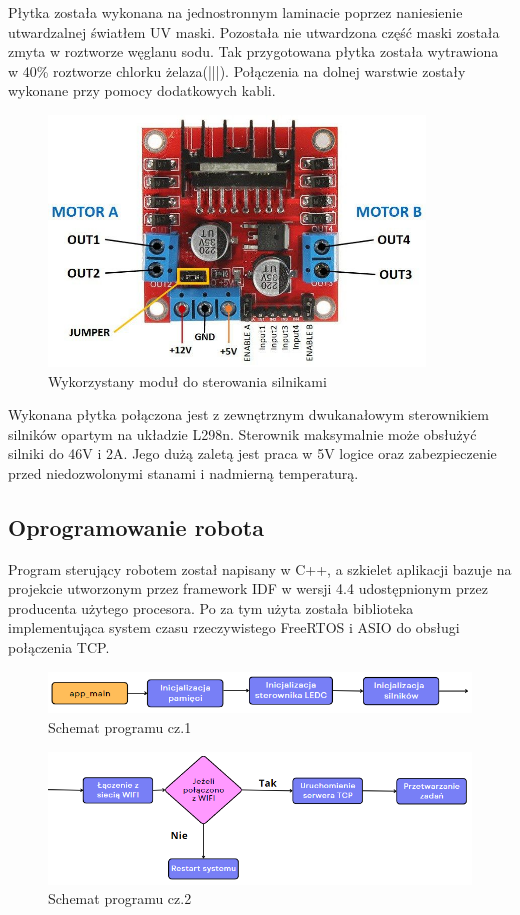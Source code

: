 Płytka została wykonana na jednostronnym laminacie poprzez naniesienie utwardzalnej światłem UV maski. Pozostała nie utwardzona część maski 
została zmyta w roztworze węglanu sodu. Tak przygotowana płytka została wytrawiona w 40\% roztworze chlorku żelaza(|||). 
Połączenia na dolnej warstwie zostały wykonane przy pomocy dodatkowych kabli. 

\begin{figure}[H]
	\centering
	\includegraphics[width=10cm]{pages/robot/zdjecia/l298n_modul.jpg}
	\caption{Wykorzystany moduł do sterowania silnikami}
	\label{Fig:modulL298}
\end{figure}

Wykonana płytka połączona jest z zewnętrznym dwukanałowym sterownikiem silników opartym na układzie L298n. 
Sterownik maksymalnie może obsłużyć silniki do 46V i 2A. Jego dużą zaletą jest praca w 5V logice
oraz zabezpieczenie przed niedozwolonymi stanami i nadmierną temperaturą. 


\subsection{Oprogramowanie robota}

Program sterujący robotem został napisany w C++,
a szkielet aplikacji bazuje na projekcie utworzonym przez framework IDF w wersji 4.4 udostępnionym 
przez producenta użytego procesora. Po za tym użyta została biblioteka implementująca 
system czasu rzeczywistego FreeRTOS i ASIO do obsługi połączenia TCP. 
\begin{figure}[H]
	\centering
	\includegraphics[width=14cm]{pages/robot/zdjecia/schematy/softSchematCz1.png}
	\caption{Schemat programu cz.1 }
	\label{Fig:Rysunek}
\end{figure}
\begin{figure}[H]
	\centering
	\includegraphics[width=14cm]{pages/robot/zdjecia/schematy/softSchematCz2.png}
	\caption{Schemat programu cz.2}
	\label{Fig:Rysunek}
\end{figure}

